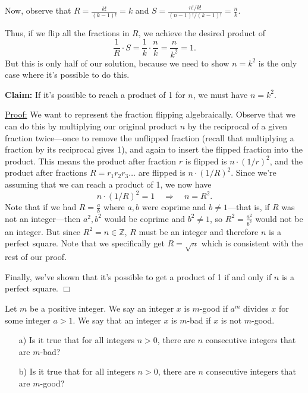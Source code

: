 \begin{solution}
Now, observe that $\displaystyle R=\frac{k!}{(k-1)!} = k$ and $\displaystyle S=\frac{n!/k!}{(n-1)!/(k-1)!} = \frac{n}{k}$.

Thus, if we flip all the fractions in $R$, we achieve the desired product of
\[
    \frac{1}{R} \cdot S = \frac{1}{k} \cdot \frac{n}{k} = \frac{n}{k^2} = 1.
\]
But this is only half of our solution, because we need to show $n=k^2$ is the only case where it's possible to do this.

\textbf{Claim:} If it's possible to reach a product of 1 for $n$, we must have $n=k^2$.%

\underline{Proof:} We want to represent the fraction flipping algebraically. Observe that we can do this by multiplying our original product $n$ by the reciprocal of a given fraction twice---once to remove the unflipped fraction (recall that multiplying a fraction by its reciprocal gives 1), and again to insert the flipped fraction into the product. This means the product after fraction $r$ is flipped is $n\cdot(1/r)^2$, and the product after fractions $R=r_1r_2r_3\dots$ are flipped is $n\cdot(1/R)^2$. Since we're assuming that we can reach a product of 1, we now have
\[
    n\cdot(1/R)^2 = 1 \quad \Rightarrow \quad n=R^2.
\]
Note that if we had $R=\frac{a}{b}$ where $a,b$ were coprime and $b\neq1$---that is, if $R$ was not an integer---then $a^2,b^2$ would be coprime and $b^2\neq1$, so $R^2=\frac{a^2}{b^2}$ would not be an integer. But since $R^2=n\in\mathbb{Z}$, $R$ must be an integer and therefore $n$ is a perfect square. Note that we specifically get $R=\sqrt{n}$ which is consistent with the rest of our proof.

Finally, we've shown that it's possible to get a product of 1 if and only if $n$ is a perfect square. $\Box$
\end{solution}

\begin{problem}[C][8][Mock Spain 2025/2]
    Let $m$ be a positive integer. We say an integer $x$ is $m$-good if $a^m$ divides $x$ for some integer $a>1$. We say that an integer $x$ is $m$-bad if $x$ is not $m$-good. \smallbreak
    
    \begin{itemize}
        \item[a)] Is it true that for all integers $n>0$, there are $n$ consecutive integers that are $m$-bad? 
        \item[b)] Is it true that for all integers $n>0$, there are $n$ consecutive integers that are $m$-good? 
    \end{itemize}
\end{problem}

